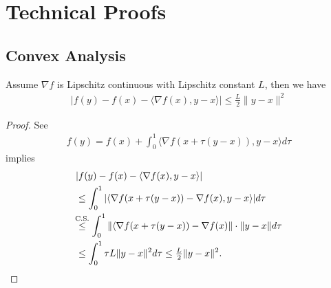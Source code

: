 

\chapter{Technical Proofs}

\section{Convex Analysis}

\begin{lemma}\label{Lipschitz Gradient implies taylor inequality}
	Assume \(\nabla f\) is Lipschitz continuous with Lipschitz constant \(L\),
	then we have
	\begin{align*}
		| f(y) - f(x) - \langle \nabla f(x), y-x\rangle | \le \tfrac{L}2 \|y-x\|^2
	\end{align*}
\end{lemma}
\begin{proof}
	See \textcite[Lemma 1.2.3]{nesterovLecturesConvexOptimization2018}
	\begin{align*}
		f(y) = f(x) + \int_0^1\langle\nabla f(x+\tau(y-x)), y-x \rangle d\tau
	\end{align*}
	implies
	\begin{align*}
		&| f(y) - f(x) - \langle \nabla f(x), y-x\rangle | \\
		&\le \int_0^1 | \langle\nabla f(x+\tau(y-x))-\nabla f(x), y-x\rangle | d\tau \\
		&\lxle{\text{C.S.}}
		\int_0^1 \|\langle\nabla f(x+\tau(y-x))-\nabla f(x)\| \cdot \|y-x\| d\tau\\
		&\le \int_0^1 \tau L \|y-x\|^2 d\tau \le \tfrac{L}2 \|y-x\|^2.
		\qedhere
	\end{align*}
\end{proof}


\endinput